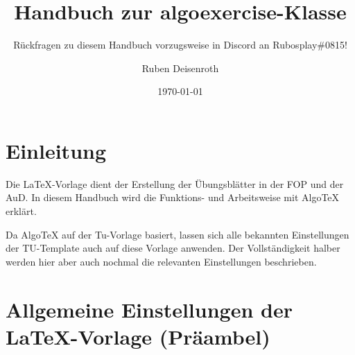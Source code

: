 \documentclass[
    titleprefix=AlgoTeX,
    inlineshortcut=java,
    corporatedesign,
    boxarc,
]{algoexercise}
\date{\today}
\author{Ruben Deisenroth}
\subtitle{Rückfragen zu diesem Handbuch vorzugsweise in Discord an Rubosplay\#0815!}
\title[Handbuch]{Handbuch zur algoexercise-Klasse}
\begin{document}


    \maketitle{}

    \tableofcontents{}
    \clearpage{}


    \section{Einleitung}
    Die \LaTeX-Vorlage dient der Erstellung der Übungsblätter in der FOP und der AuD.
    In diesem Handbuch wird die Funktions- und Arbeitsweise mit Algo\TeX{} erklärt.

    Da Algo\TeX{} auf der Tu-Vorlage basiert, lassen sich alle bekannten Einstellungen der TU-Template auch auf diese Vorlage
    anwenden.
    Der Vollständigkeit halber werden hier aber auch nochmal die relevanten Einstellungen beschrieben.
    \vspace{-1em}
    \section{Allgemeine Einstellungen der LaTeX-Vorlage (Präambel)}
    \vspace{-1em}
\end{document}

